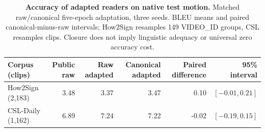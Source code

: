 \begin{table}[!t]
\centering
\caption{\textbf{Accuracy of adapted readers on native test motion.} Matched raw/canonical five-epoch adaptation, three seeds. BLEU means and paired canonical-minus-raw intervals; How2Sign resamples 149 VIDEO\_ID groups, CSL resamples clips. Closure does not imply linguistic adequacy or universal zero accuracy cost.}
\label{tab:readers}
\begin{tabular}{lrrrrr}\toprule
Corpus (clips)&Public raw&Raw adapted&Canonical adapted&Paired difference&95\% interval\\\midrule
How2Sign (2,183)&3.48&3.37&3.47&0.10&$[-0.01,0.21]$\\
CSL-Daily (1,162)&6.89&7.24&7.22&-0.02&$[-0.19,0.15]$\\
\bottomrule\end{tabular}\end{table}
